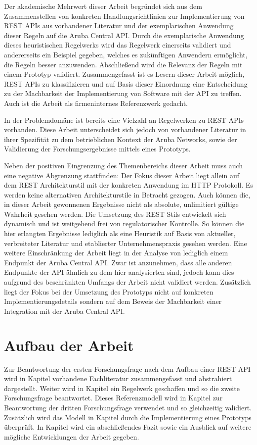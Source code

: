 Der akademische Mehrwert dieser Arbeit begründet sich aus dem Zusammenstellen von konkreten Handlungsrichtlinien zur Implementierung von REST APIs aus vorhandener Literatur und der exemplarischen Anwendung dieser Regeln auf die Aruba Central API. Durch die exemplarische Anwendung dieses heuristischen Regelwerks wird das Regelwerk einerseits validiert und andererseits ein Beispiel gegeben, welches es zukünftigen Anwendern ermöglicht, die Regeln besser anzuwenden. Abschließend wird die Relevanz der Regeln mit einem Prototyp validiert. Zusammengefasst ist es Lesern dieser Arbeit möglich, REST APIs zu klassifizieren und auf Basis dieser Einordnung eine Entscheidung zu der Machbarkeit der Implementierung von Software mit der API zu treffen. Auch ist die Arbeit als firmeninternes Referenzwerk gedacht.

In der Problemdomäne ist bereits eine Vielzahl an Regelwerken zu REST APIs vorhanden. Diese Arbeit unterscheidet sich jedoch von vorhandener Literatur in ihrer Spezifität zu dem betrieblichen Kontext der Aruba Networks, sowie der Validierung der Forschungsergebnisse mittels eines Prototyps.

Neben der positiven Eingrenzung des Themenbereichs dieser Arbeit muss auch eine negative Abgrenzung stattfinden: Der Fokus dieser Arbeit liegt allein auf dem REST Architekturstil mit der konkreten Anwendung im HTTP Protokoll. Es werden keine alternativen Architekturstile in Betracht gezogen. Auch können die, in dieser Arbeit gewonnenen Ergebnisse nicht als absolute, unlimitiert gültige Wahrheit gesehen werden. Die Umsetzung des REST Stils entwickelt sich dynamisch und ist weitgehend frei von regulatorischer Kontrolle. So können die hier erlangten Ergebnisse lediglich als eine Heuristik auf Basis von aktueller, verbreiteter Literatur und etablierter Unternehmenspraxis gesehen werden. Eine weitere Einschränkung der Arbeit liegt in der Analyse von lediglich einem Endpunkt der Aruba Central API. Zwar ist anzunehmen, dass alle anderen Endpunkte der API ähnlich zu dem hier analysierten sind, jedoch kann dies aufgrund des beschränkten Umfangs der Arbeit nicht validiert werden. Zusätzlich liegt der Fokus bei der Umsetzung des Prototyps nicht auf konkreten Implementierungsdetails sondern auf dem Beweis der Machbarkeit einer Integration mit der Aruba Central API.


\section{Aufbau der Arbeit}

Zur Beantwortung der ersten Forschungsfrage nach dem Aufbau einer REST API wird in Kapitel vorhandene Fachliteratur zusammengefasst und abstrahiert dargestellt. Weiter wird in Kapitel ein Regelwerk geschaffen und so die zweite Forschungsfrage beantwortet. Dieses Referenzmodell wird in Kapitel zur Beantwortung der dritten Forschungsfrage verwendet und so gleichzeitig validiert. Zusätzlich wird das Modell in Kapitel durch die Implementierung eines Prototyps überprüft. In Kapitel wird ein abschließendes Fazit sowie ein Ausblick auf weitere mögliche Entwicklungen der Arbeit gegeben.
